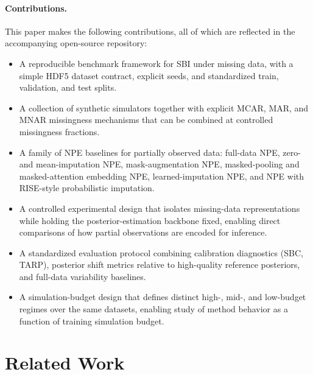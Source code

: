 \documentclass{article} %
\begin{document}
\paragraph{Contributions.} This paper makes the following contributions, all of
which are reflected in the accompanying open-source repository:
\begin{itemize}
  \item A reproducible benchmark framework for SBI under missing data, with a
  simple HDF5 dataset contract, explicit seeds, and standardized train,
  validation, and test splits.
  \item A collection of synthetic simulators together with explicit MCAR, MAR,
  and MNAR missingness mechanisms that can be combined at controlled missingness
  fractions.
  \item A family of NPE baselines for partially observed data: full-data NPE,
  zero- and mean-imputation NPE, mask-augmentation NPE, masked-pooling and
  masked-attention embedding NPE, learned-imputation NPE, and NPE with
  RISE-style probabilistic imputation.
  \item A controlled experimental design that isolates missing-data
  representations while holding the posterior-estimation backbone fixed, enabling
  direct comparisons of how partial observations are encoded for inference.
  \item A standardized evaluation protocol combining calibration diagnostics
  (SBC, TARP), posterior shift metrics relative to high-quality reference
  posteriors, and full-data variability baselines.
  \item A simulation-budget design that defines distinct high-, mid-, and
  low-budget regimes over the same datasets, enabling study of method behavior
  as a function of training simulation budget.
\end{itemize}

\section{Related Work}
\label{sec:related-work}
\end{document}
